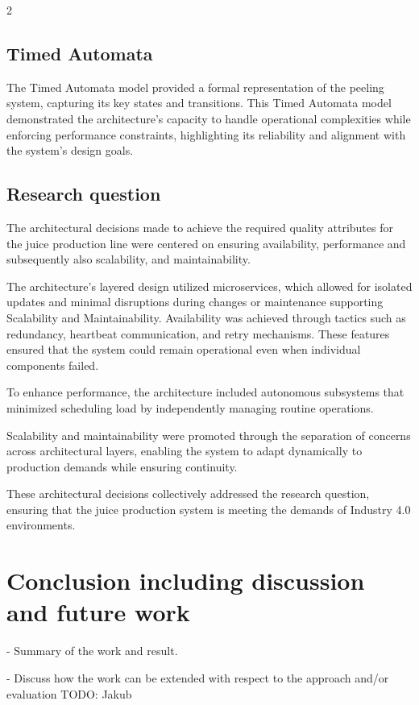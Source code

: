 \documentclass{article}
\begin{document}
\begin{multicols}{2}
\subsection{Timed Automata}
The Timed Automata model provided a formal representation of the peeling system, capturing its key states and transitions. This Timed Automata model demonstrated the architecture's capacity to handle operational complexities while enforcing performance constraints, highlighting its reliability and alignment with the system's design goals.

\subsection{Research question}
The architectural decisions made to achieve the required quality attributes for the juice production line were centered on ensuring availability, performance and subsequently also scalability, and maintainability.

The architecture's layered design utilized microservices, which allowed for isolated updates and minimal disruptions during changes or maintenance supporting Scalability and Maintainability. Availability was achieved through tactics such as redundancy, heartbeat communication, and retry mechanisms. These features ensured that the system could remain operational even when individual components failed.

To enhance performance, the architecture included autonomous subsystems that minimized scheduling load by independently managing routine operations.

 Scalability and maintainability were promoted through the separation of concerns across architectural layers, enabling the system to adapt dynamically to production demands while ensuring continuity.

 These architectural decisions collectively addressed the research question, ensuring that the juice production system is meeting the demands of Industry 4.0 environments.

\section{Conclusion including discussion and future work}
\color{blue}
- Summary of the work and result.

- Discuss how the work can be extended with respect to the approach and/or evaluation
\color{red} TODO: Jakub

\color{black}



\end{multicols}
\end{document}
